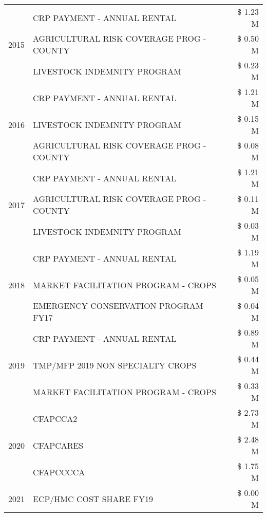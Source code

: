 \begin{tabular}{llr}
\cline{1-3}
\multirow[t]{3}{*}{2015} & CRP PAYMENT - ANNUAL RENTAL & \$ 1.23 M \\
 & AGRICULTURAL RISK COVERAGE PROG - COUNTY & \$ 0.50 M \\
 & LIVESTOCK INDEMNITY PROGRAM & \$ 0.23 M \\
\cline{1-3}
\multirow[t]{3}{*}{2016} & CRP PAYMENT - ANNUAL RENTAL & \$ 1.21 M \\
 & LIVESTOCK INDEMNITY PROGRAM & \$ 0.15 M \\
 & AGRICULTURAL RISK COVERAGE PROG - COUNTY & \$ 0.08 M \\
\cline{1-3}
\multirow[t]{3}{*}{2017} & CRP PAYMENT - ANNUAL RENTAL & \$ 1.21 M \\
 & AGRICULTURAL RISK COVERAGE PROG - COUNTY & \$ 0.11 M \\
 & LIVESTOCK INDEMNITY PROGRAM & \$ 0.03 M \\
\cline{1-3}
\multirow[t]{3}{*}{2018} & CRP PAYMENT - ANNUAL RENTAL & \$ 1.19 M \\
 & MARKET FACILITATION PROGRAM - CROPS & \$ 0.05 M \\
 & EMERGENCY CONSERVATION PROGRAM FY17 & \$ 0.04 M \\
\cline{1-3}
\multirow[t]{3}{*}{2019} & CRP PAYMENT - ANNUAL RENTAL & \$ 0.89 M \\
 & TMP/MFP 2019 NON SPECIALTY CROPS & \$ 0.44 M \\
 & MARKET FACILITATION PROGRAM - CROPS & \$ 0.33 M \\
\cline{1-3}
\multirow[t]{3}{*}{2020} & CFAPCCA2 & \$ 2.73 M \\
 & CFAPCARES & \$ 2.48 M \\
 & CFAPCCCCA & \$ 1.75 M \\
\cline{1-3}
2021 & ECP/HMC COST SHARE FY19 & \$ 0.00 M \\
\cline{1-3}
\bottomrule
\end{tabular}

